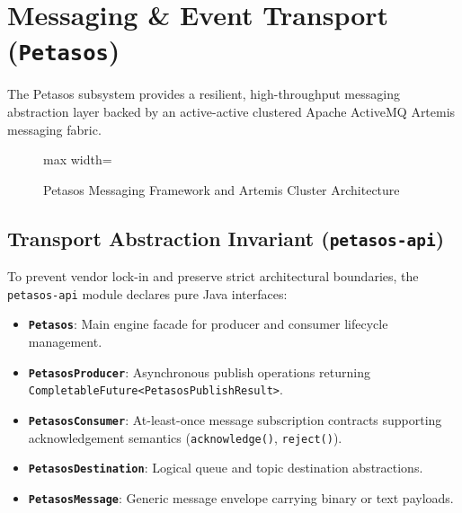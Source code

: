 
\chapter{Messaging \& Event Transport (\texttt{Petasos})}
\label{chap:messaging_petasos}

The Petasos subsystem provides a resilient, high-throughput messaging abstraction layer backed by an active-active clustered Apache ActiveMQ Artemis messaging fabric.

\begin{figure}[htbp]
    \centering
    \begin{adjustbox}{max width=\textwidth}
        
    \end{adjustbox}
    \caption{Petasos Messaging Framework and Artemis Cluster Architecture}
    \label{fig:petasos_messaging}
\end{figure}

\section{Transport Abstraction Invariant (\texttt{petasos-api})}

To prevent vendor lock-in and preserve strict architectural boundaries, the \texttt{petasos-api} module declares pure Java interfaces:
\begin{itemize}
    \item \textbf{\texttt{Petasos}}: Main engine facade for producer and consumer lifecycle management.
    \item \textbf{\texttt{PetasosProducer}}: Asynchronous publish operations returning \nolinkurl{CompletableFuture<PetasosPublishResult>}.
    \item \textbf{\texttt{PetasosConsumer}}: At-least-once message subscription contracts supporting acknowledgement semantics (\nolinkurl{acknowledge()}, \nolinkurl{reject()}).
    \item \textbf{\texttt{PetasosDestination}}: Logical queue and topic destination abstractions.
    \item \textbf{\texttt{PetasosMessage}}: Generic message envelope carrying binary or text payloads.
\end{itemize}

